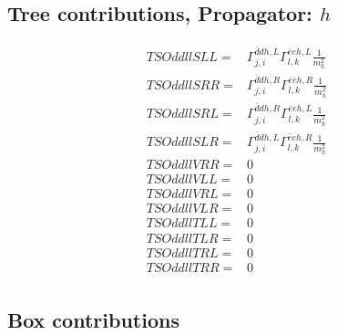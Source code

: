 \documentclass[A4,landscape]{article}
\begin{document}
\subsection{Tree contributions, Propagator: $h$} 

\begin{align} 
  TSOddllSLL= & \Gamma^{\bar{d}d h ,L}_{j, i} \Gamma^{\bar{e}e h ,L}_{l, k} \frac{1}{m^2_{h}} \\ 
  TSOddllSRR= & \Gamma^{\bar{d}d h ,R}_{j, i} \Gamma^{\bar{e}e h ,R}_{l, k} \frac{1}{m^2_{h}} \\ 
  TSOddllSRL= & \Gamma^{\bar{d}d h ,R}_{j, i} \Gamma^{\bar{e}e h ,L}_{l, k} \frac{1}{m^2_{h}} \\ 
  TSOddllSLR= & \Gamma^{\bar{d}d h ,L}_{j, i} \Gamma^{\bar{e}e h ,R}_{l, k} \frac{1}{m^2_{h}} \\ 
  TSOddllVRR= & 0 \\ 
  TSOddllVLL= & 0 \\ 
  TSOddllVRL= & 0 \\ 
  TSOddllVLR= & 0 \\ 
  TSOddllTLL= & 0 \\ 
  TSOddllTLR= & 0 \\ 
  TSOddllTRL= & 0 \\ 
  TSOddllTRR= & 0 \\ 
\end{align} 
\subsection{Box contributions} 
\end{document}
